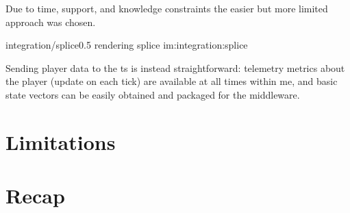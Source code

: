 Due to time, support, and knowledge constraints the easier but more limited approach was chosen.

\begin{image}
	{integration/splice}{0.5}
	{rendering splice}
	{im:integration:splice}
	{}
\end{image}

Sending player data to the \gls{ts} is instead straightforward: telemetry metrics about the player (update on each tick) are available at all times within \gls{me}, and basic state vectors can be easily obtained and packaged for the \gls{middleware}.

\section{Limitations}\label{sc:integration:limitations}

\section{Recap}\label{sc:integration:recap}
